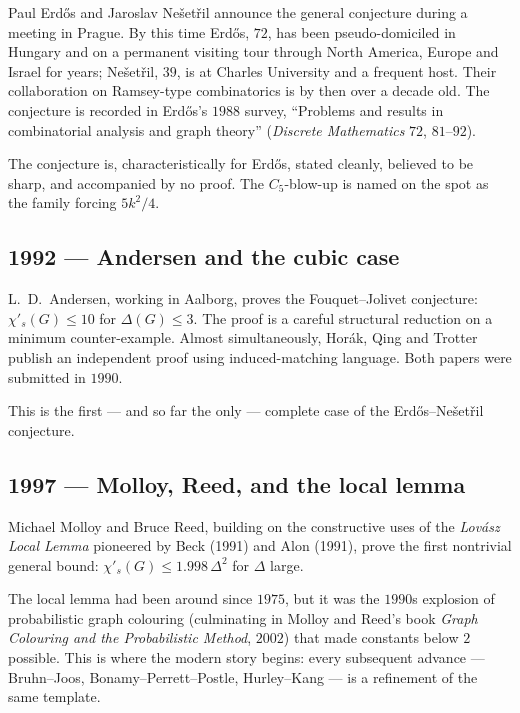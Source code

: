 \documentclass[11pt]{article}
\newcommand{\sci}{\chi'_s}
\begin{document}
Paul Erd\H{o}s and Jaroslav Ne\v{s}et\v{r}il announce the general
conjecture during a meeting in Prague. By this time Erd\H{o}s, $72$,
has been pseudo-domiciled in Hungary and on a permanent visiting
tour through North America, Europe and Israel for years; Ne\v{s}et\v{r}il,
$39$, is at Charles University and a frequent host. Their
collaboration on Ramsey-type combinatorics is by then over a decade
old. The conjecture is recorded in Erd\H{o}s's $1988$ survey,
``Problems and results in combinatorial analysis and graph theory''
(\emph{Discrete Mathematics} $72$, $81$--$92$).

The conjecture is, characteristically for Erd\H{o}s, stated cleanly,
believed to be sharp, and accompanied by no proof. The
$C_5$-blow-up is named on the spot as the family forcing $5k^2/4$.

\subsection*{1992 --- Andersen and the cubic case}

L.\ D.\ Andersen, working in Aalborg, proves the Fouquet--Jolivet
conjecture: $\sci(G) \leq 10$ for $\Delta(G) \leq 3$. The proof is
a careful structural reduction on a minimum counter-example. Almost
simultaneously, Hor\'ak, Qing and Trotter publish an independent
proof using induced-matching language. Both papers were submitted in
$1990$.

This is the first --- and so far the only --- complete case of the
Erd\H{o}s--Ne\v{s}et\v{r}il conjecture.

\subsection*{1997 --- Molloy, Reed, and the local lemma}

Michael Molloy and Bruce Reed, building on the constructive uses of
the \emph{Lov\'asz Local Lemma} pioneered by Beck (1991) and
Alon (1991), prove the first nontrivial general bound:
$\sci(G) \leq 1.998\,\Delta^2$ for $\Delta$ large.

The local lemma had been around since $1975$, but it was the
$1990$s explosion of probabilistic graph colouring (culminating in
Molloy and Reed's book \emph{Graph Colouring and the Probabilistic
Method}, $2002$) that made constants below $2$ possible. This is
where the modern story begins: every subsequent advance ---
Bruhn--Joos, Bonamy--Perrett--Postle, Hurley--Kang --- is a refinement
of the same template.
\end{document}
